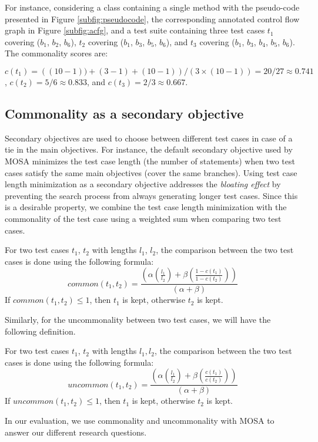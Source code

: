 For instance, considering a class containing a single method with the pseudo-code presented in Figure \ref{subfig:pseudocode}, the corresponding annotated control flow graph in Figure \ref{subfig:acfg}, and a test suite containing three test cases $t_1$ covering ($b_1$, $b_2$, $b_6$), $t_2$ covering ($b_1$, $b_3$, $b_5$, $b_6$), and $t_3$ covering ($b_1$, $b_3$, $b_4$, $b_5$, $b_6$). The commonality scores are:


$c(t_1) = \left( (10-1))+ (3-1) + (10-1) \right)/\left(3 \times (10 - 1)\right) = 20/27 \approx 0.741$, 
$c(t_2) = 5/6 \approx 0.833$, and 
$c(t_3) = 2/3 \approx 0.667$.


\subsection{Commonality as a secondary objective}

Secondary objectives are used to choose between different test cases in case of a tie in the main objectives. For instance, the default secondary objective used by MOSA \cite{Panichella2015} minimizes the test case length (\ie the number of statements) when two test cases satisfy the same main objectives (\eg cover the same branches). Using test case length minimization as a secondary objective addresses the \emph{bloating effect} \cite{Silva2012} by preventing the search process from always generating longer test cases. Since this is a desirable property, we combine the test case length minimization with the commonality of the test case using a weighted sum when comparing two test cases. 
%
\begin{definition}\label{def:common}
    For two test cases $t_1$, $t_2$ with lengths $l_1$, $l_2$, the comparison between the two test cases is done using the following formula: 
    $$\textit{common}(t_1,t_2) = \frac{\left( 
        \alpha \left( \frac{l_1}{l_2} \right) +
        \beta \left( \frac{1 - c(t_1)}{1 - c(t_2)} \right)
    \right)}{\left(\alpha + \beta \right)} $$
    If $\textit{common}(t_1,t_2) \leq 1$, then $t_1$ is kept, otherwise $t_2$ is kept. 
\end{definition}
%
Similarly, for the uncommonality between two test cases, we will have the following definition.
%
\begin{definition}\label{def:uncommon}
    For two test cases $t_1$, $t_2$ with lengths $l_1, l_2$, the comparison between the two test cases is done using the following formula: 
    $$\textit{uncommon}(t_1,t_2) = \frac{\left( 
        \alpha \left( \frac{l_1}{l_2} \right) +
        \beta \left( \frac{c(t_1)}{c(t_2)} \right)
    \right)}{\left(\alpha + \beta \right)} $$
    If $\textit{uncommon}(t_1,t_2) \leq 1$, then $t_1$ is kept, otherwise $t_2$ is kept. 
\end{definition}
%
In our evaluation, we use commonality and uncommonality with MOSA to answer our different research questions. 
